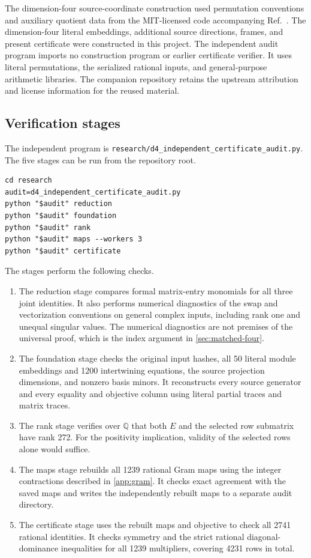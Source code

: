 \documentclass[aps,pra,reprint,superscriptaddress,amsmath,amssymb,floatfix,nofootinbib]{revtex4-2}
\newcommand{\Q}{\mathbb Q}
\begin{document}
The dimension-four source-coordinate construction used permutation
conventions and auxiliary quotient data from the MIT-licensed code
accompanying Ref.~\cite{Candidate}. The dimension-four literal embeddings,
additional source directions, frames, and present certificate were
constructed in this project.
The independent audit program imports no construction program or earlier
certificate verifier. It uses literal permutations, the serialized
rational inputs, and general-purpose arithmetic libraries.
The companion repository retains the upstream attribution and license
information for the reused material.

\subsection{Verification stages}

The independent program is
\nolinkurl{research/d4_independent_certificate_audit.py}.
The five stages can be run from the repository root.
\begin{verbatim}
cd research
audit=d4_independent_certificate_audit.py
python "$audit" reduction
python "$audit" foundation
python "$audit" rank
python "$audit" maps --workers 3
python "$audit" certificate
\end{verbatim}
The stages perform the following checks.
\begin{enumerate}
\item The reduction stage compares formal matrix-entry monomials for all
three joint identities. It also performs numerical diagnostics of the
swap and vectorization conventions on general complex inputs, including
rank one and unequal singular values. The numerical diagnostics are not
premises of the universal proof, which is the index argument in
\cref{sec:matched-four}.
\item The foundation stage checks the original input hashes, all 50
literal module embeddings and 1200 intertwining equations, the source
projection dimensions, and nonzero basis minors. It reconstructs every
source generator and every equality and objective column using literal
partial traces and matrix traces.
\item The rank stage verifies over $\Q$ that both $E$ and the selected
row submatrix have rank 272. For the positivity implication, validity of
the selected rows alone would suffice.
\item The maps stage rebuilds all 1239 rational Gram maps using the
integer contractions described in \cref{app:gram}. It checks exact
agreement with the saved maps and writes the independently rebuilt maps
to a separate audit directory.
\item The certificate stage uses the rebuilt maps and objective to check
all 2741 rational identities. It checks symmetry and the strict rational
diagonal-dominance inequalities for all 1239 multipliers, covering 4231
rows in total.
\end{enumerate}
\end{document}
